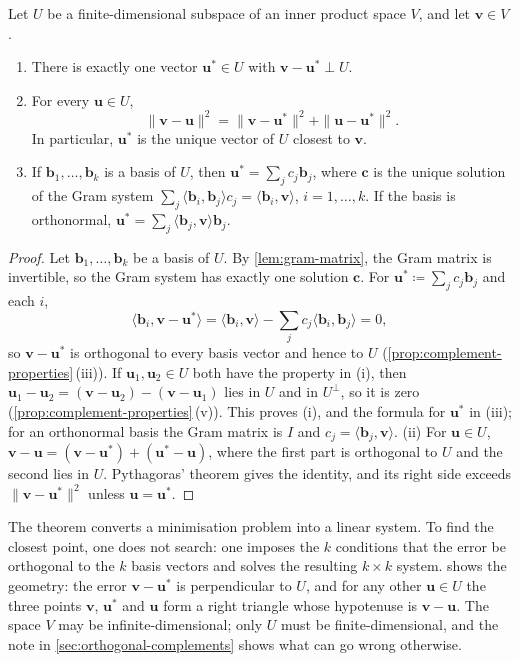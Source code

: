 \begin{theorem}
\label{thm:best-approximation}
Let $U$ be a finite-dimensional subspace of an inner product space $V$, and let $\mathbf v\in V$.
\begin{enumerate}
\item There is exactly one vector $\mathbf u^*\in U$ with $\mathbf v-\mathbf u^*\perp U$.
\item For every $\mathbf u\in U$,
\[
\|\mathbf v-\mathbf u\|^2=\|\mathbf v-\mathbf u^*\|^2+\|\mathbf u-\mathbf u^*\|^2 .
\]
In particular, $\mathbf u^*$ is the unique vector of $U$ closest to $\mathbf v$.
\item If $\mathbf b_1,\ldots,\mathbf b_k$ is a basis of $U$, then $\mathbf u^*=\sum_jc_j\mathbf b_j$, where $\mathbf c$ is the unique solution of the Gram system $\sum_j\langle\mathbf b_i,\mathbf b_j\rangle c_j=\langle\mathbf b_i,\mathbf v\rangle$, $i=1,\ldots,k$. If the basis is orthonormal, $\mathbf u^*=\sum_j\langle\mathbf b_j,\mathbf v\rangle\mathbf b_j$.
\end{enumerate}
\end{theorem}

\begin{proof}
Let $\mathbf b_1,\ldots,\mathbf b_k$ be a basis of $U$. By \cref{lem:gram-matrix}, the Gram matrix is invertible, so the Gram system has exactly one solution $\mathbf c$. For $\mathbf u^*\coloneqq\sum_jc_j\mathbf b_j$ and each $i$,
\[
\langle\mathbf b_i,\mathbf v-\mathbf u^*\rangle=\langle\mathbf b_i,\mathbf v\rangle-\sum_jc_j\langle\mathbf b_i,\mathbf b_j\rangle=0,
\]
so $\mathbf v-\mathbf u^*$ is orthogonal to every basis vector and hence to $U$ (\cref{prop:complement-properties}\,(iii)). If $\mathbf u_1,\mathbf u_2\in U$ both have the property in (i), then $\mathbf u_1-\mathbf u_2=(\mathbf v-\mathbf u_2)-(\mathbf v-\mathbf u_1)$ lies in $U$ and in $U^\perp$, so it is zero (\cref{prop:complement-properties}\,(v)). This proves (i), and the formula for $\mathbf u^*$ in (iii); for an orthonormal basis the Gram matrix is $I$ and $c_j=\langle\mathbf b_j,\mathbf v\rangle$. (ii) For $\mathbf u\in U$, $\mathbf v-\mathbf u=(\mathbf v-\mathbf u^*)+(\mathbf u^*-\mathbf u)$, where the first part is orthogonal to $U$ and the second lies in $U$. Pythagoras' theorem gives the identity, and its right side exceeds $\|\mathbf v-\mathbf u^*\|^2$ unless $\mathbf u=\mathbf u^*$.
\end{proof}

The theorem converts a minimisation problem into a linear system. To find the closest point, one does not search: one imposes the $k$ conditions that the error be orthogonal to the $k$ basis vectors and solves the resulting $k\times k$ system.  shows the geometry: the error $\mathbf v-\mathbf u^*$ is perpendicular to $U$, and for any other $\mathbf u\in U$ the three points $\mathbf v$, $\mathbf u^*$ and $\mathbf u$ form a right triangle whose hypotenuse is $\mathbf v-\mathbf u$. The space $V$ may be infinite-dimensional; only $U$ must be finite-dimensional, and the note in \cref{sec:orthogonal-complements} shows what can go wrong otherwise.

